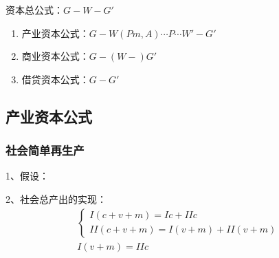 \documentclass[12pt]{book}
\begin{document}
资本总公式：$G-W-G'$
\begin{enumerate}[(1)]
    \item 产业资本公式：$G-W(Pm,A)\cdots P\cdots W′-G′$
    \item 商业资本公式：$G-(W-)G'$
    \item 借贷资本公式：$G-G'$
\end{enumerate}















\subsection{产业资本公式}




\subsubsection{社会简单再生产}



1、假设：


2、社会总产出的实现：
\begin{gather*}
    \begin{cases}
        I(c+v+m)=I c+II c \\
        II (c+v+m)=I(v+m)+II(v+m)
    \end{cases}\\
    I(v+m)=IIc
\end{gather*}
\end{document}
